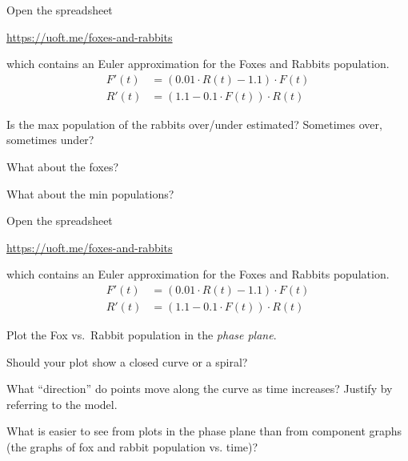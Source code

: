 \documentclass{workbook}
\begin{document}
\begin{slide}
	\question
	Open the spreadsheet

	\url{https://uoft.me/foxes-and-rabbits}

	which contains an Euler approximation for the Foxes and Rabbits population.
	\begin{align*}
		F'(t) &= (0.01\cdot R(t) - 1.1)\cdot F(t)\\
		R'(t) &= (1.1 - 0.1\cdot F(t))\cdot R(t)
	\end{align*}

	\begin{parts}
		\item Is the max population of the rabbits over/under estimated? Sometimes over, sometimes under?
		\item What about the foxes?
		\item What about the min populations?
	\end{parts}
\end{slide}

\begin{slide}
	\question
	Open the spreadsheet

	\url{https://uoft.me/foxes-and-rabbits}

	which contains an Euler approximation for the Foxes and Rabbits population.
	\begin{align*}
		F'(t) &= (0.01\cdot R(t) - 1.1)\cdot F(t)\\
		R'(t) &= (1.1 - 0.1\cdot F(t))\cdot R(t)
	\end{align*}


	\begin{parts}
		\item Plot the Fox vs.~Rabbit population in the \emph{phase plane}. 
		\item Should your plot show a closed curve or a spiral?
		\item What ``direction'' do points move along the curve as time increases? Justify by referring to the model.
		\item What is easier to see from plots in the phase plane than from component graphs (the graphs of
		fox and rabbit population vs. time)?
	\end{parts}
\end{slide}
\end{document}
